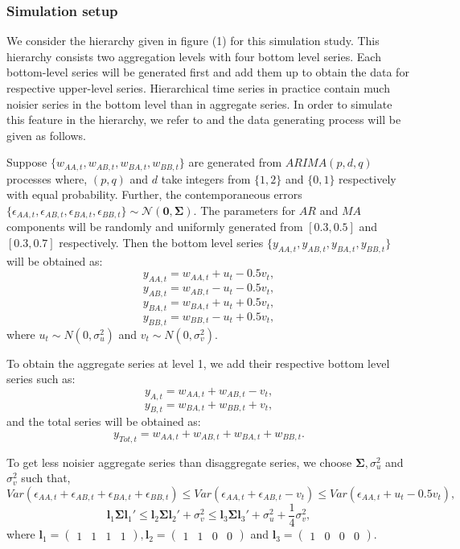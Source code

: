 \documentclass[a4paper, 11pt]{article}
\begin{document}
\subsubsection*{Simulation setup}

We consider the hierarchy given in figure (1) for this simulation study. This hierarchy consists two aggregation levels with four bottom level series. Each bottom-level series will be generated first and add them up to obtain the data for respective upper-level series. Hierarchical time series in practice contain much noisier series in the bottom level than in aggregate series. In order to simulate this feature in the hierarchy, we refer to \citet{Wickramasuriya2017} and the data generating process will be given as follows.

Suppose $\{w_{AA,t},w_{AB,t},w_{BA,t},w_{BB,t}\}$ are generated from $ARIMA(p,d,q)$ processes where, $(p,q)$ and $d$ take integers from $\{1,2\}$ and $\{0,1\}$ respectively with equal probability. Further, the contemporaneous errors $\{\epsilon_{AA,t},\epsilon_{AB,t},\epsilon_{BA,t},\epsilon_{BB,t}\} \sim \mathcal{N}(\bm{0}, \bm{\Sigma})$. The parameters for $AR$ and $MA$ components will be randomly and uniformly generated from $[0.3,0.5]$ and $[0.3,0.7]$ respectively. Then the bottom level series $\{y_{AA,t},y_{AB,t},y_{BA,t},y_{BB,t}\}$ will be obtained as:
$$y_{AA,t} = w_{AA,t} + u_t - 0.5v_t,$$
$$y_{AB,t} = w_{AB,t} - u_t - 0.5v_t,$$
$$y_{BA,t} = w_{BA,t} + u_t + 0.5v_t,$$
$$y_{BB,t} = w_{BB,t} - u_t + 0.5v_t,$$
where $u_t \sim N(0,\sigma^2_u)$ and $v_t \sim N(0,\sigma^2_v)$.

To obtain the aggregate series at level 1, we add their respective bottom level series such as:
$$y_{A,t} = w_{AA,t} + w_{AB,t} - v_t,$$
$$y_{B,t} = w_{BA,t} + w_{BB,t} + v_t,$$
and the total series will be obtained as:
$$y_{Tot,t} = w_{AA,t} + w_{AB,t} + w_{BA,t} + w_{BB,t}.$$

To get less noisier aggregate series than disaggregate series, we choose $\bm{\Sigma}, \sigma^2_u$ and $\sigma^2_v$ such that,
$$
  Var(\epsilon_{AA,t}+\epsilon_{AB,t}+\epsilon_{BA,t}+\epsilon_{BB,t}) \le Var(\epsilon_{AA,t}+\epsilon_{AB,t}-v_t) \le Var(\epsilon_{AA,t}+u_t-0.5v_t),
$$
$$
  \bm{l}_1\bm{\Sigma} \bm{l}_1' \le \bm{l}_2\bm{\Sigma} \bm{l}_2' + \sigma^2_v \le  \bm{l}_3\bm{\Sigma} \bm{l}_3' + \sigma^2_u + \frac{1}{4}\sigma^2_v,
$$
where $\bm{l}_1 = \begin{pmatrix} 1&1&1&1 \end{pmatrix}, \bm{l}_2 = \begin{pmatrix} 1&1&0&0 \end{pmatrix}$ and $\bm{l}_3 = \begin{pmatrix} 1&0&0&0 \end{pmatrix}$.
\end{document}

